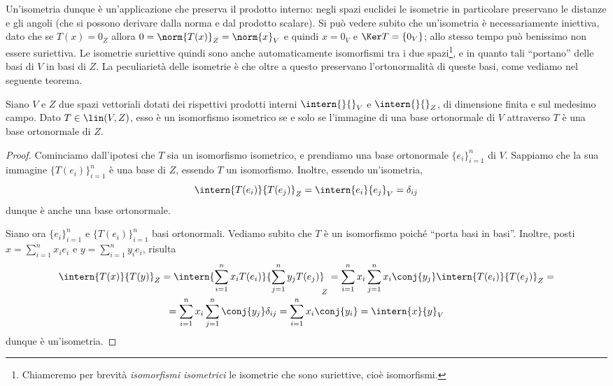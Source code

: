 Un'isometria dunque è un'applicazione che preserva il prodotto interno: negli spazi euclidei le isometrie in particolare preservano le distanze e gli angoli (che si possono derivare dalla norma e dal prodotto scalare).
Si può vedere subito che un'isometria è necessariamente iniettiva, dato che se $T(  x)=0_Z$ allora $0=\norm{T(x)}_Z=\norm{x}_V$ e quindi $x=0_V$ e $\Ker T=\{0_V\}$; allo stesso tempo può benissimo non essere suriettiva.
Le isometrie suriettive quindi sono anche automaticamente isomorfismi tra i due spazi\footnote{Chiameremo per brevità \emph{isomorfismi isometrici} le isometrie che sono suriettive, cioè isomorfismi.}, e in quanto tali ``portano'' delle basi di $V$ in basi di $Z$.
La peculiarietà delle isometrie è che oltre a questo preservano l'ortonormalità di queste basi, come vediamo nel seguente teorema.
\begin{teorema} \label{t:isometrie-basi-ortonormali}
	Siano $V$ e $Z$ due spazi vettoriali dotati dei rispettivi prodotti interni $\intern{}{}_V$ e $\intern{}{}_Z$, di dimensione finita e sul medesimo campo.
	Dato $T\in\lin(V,Z)$, esso è un isomorfismo isometrico se e solo se l'immagine di una base ortonormale di $V$ attraverso $T$ è una base ortonormale di $Z$.
\end{teorema}
\begin{proof}
	Cominciamo dall'ipotesi che $T$ sia un isomorfismo isometrico, e prendiamo una base ortonormale $\{e_i\}_{i=1}^n$ di $V$.
	Sappiamo che la sua immagine $\{T(e_i)\}_{i=1}^n$ è una base di $Z$, essendo $T$ un isomorfismo.
	Inoltre, essendo un'isometria,
	\begin{equation}
		\intern{T(e_i)}{T(e_j)}_Z=\intern{e_i}{e_j}_V=\delta_{ij}
	\end{equation}
	dunque è anche una base ortonormale.

	Siano ora $\{e_i\}_{i=1}^n$ e $\{T(e_i)\}_{i=1}^n$ basi ortonormali.
	Vediamo subito che $T$ è un isomorfismo poich\'e ``porta basi in basi''.
	Inoltre, posti $x=\sum_{i=1}^nx_ie_i$ e $y=\sum_{i=1}^ny_ie_i$, risulta
	\begin{multline}
		\intern{T(x)}{T(y)}_Z=\intern{\sum_{i=1}^nx_iT(e_i)}{\sum_{j=1}^ny_jT(e_j)}_{\!\! Z}=\sum_{i=1}^nx_i\sum_{j=1}^nx_i\conj{y_j}\intern{T(e_i)}{T(e_j)}_Z=\\
		=\sum_{i=1}^nx_i\sum_{j=1}^n\conj{y_j}\delta_{ij}=\sum_{i=1}^nx_i\conj{y_i}=\intern{x}{y}_V
	\end{multline}
	dunque è un'isometria.
\end{proof}


